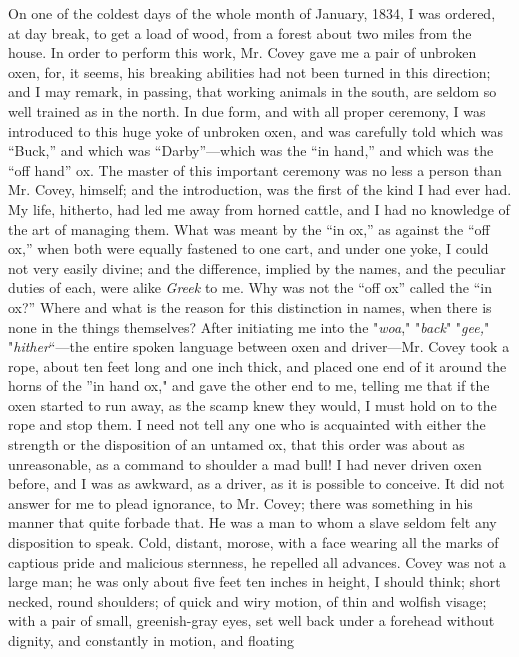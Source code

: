 On one of the coldest days of the whole month of January, 1834, I was
ordered, at day break, to get a load of wood, from a forest about two
miles from the {}house. In order to perform this work, Mr. Covey gave me
a pair of unbroken oxen, for, it seems, his breaking abilities had not
been turned in this direction; and I may remark, in passing, that
working animals in the south, are seldom so well trained as in the
north. In due form, and with all proper ceremony, I was introduced to
this huge yoke of unbroken oxen, and was carefully told which was
``Buck,'' and which was ``Darby''---which was the ``in hand,'' and which
was the ``off hand'' ox. The master of this important ceremony was no
less a person than Mr. Covey, himself; and the introduction, was the
first of the kind I had ever had. My life, hitherto, had led me away
from horned cattle, and I had no knowledge of the art of managing them.
What was meant by the ``in ox,'' as against the ``off ox,'' when both
were equally fastened to one cart, and under one yoke, I could not very
easily divine; and the difference, implied by the names, and the
peculiar duties of each, were alike \emph{Greek} to me. Why was not the
``off ox'' called the ``in ox?'' Where and what is the reason for this
distinction in names, when there is none in the things themselves? After
initiating me into the "\emph{woa}," "\emph{back}" "\emph{gee,}"
"\emph{hither}``---the entire spoken language between oxen and
driver---Mr. Covey took a rope, about ten feet long and one inch thick,
and placed one end of it around the horns of the ''in hand ox," and gave
the other end to me, telling me that if the oxen started to run away, as
the scamp knew they would, I must hold on to the rope and stop them. I
need not tell any one who is acquainted with either the strength or the
disposition of an untamed ox, that {}this order was about as
unreasonable, as a command to shoulder a mad bull! I had never driven
oxen before, and I was as awkward, as a driver, as it is possible to
conceive. It did not answer for me to plead ignorance, to Mr. Covey;
there was something in his manner that quite forbade that. He was a man
to whom a slave seldom felt any disposition to speak. Cold, distant,
morose, with a face wearing all the marks of captious pride and
malicious sternness, he repelled all advances. Covey was not a large
man; he was only about five feet ten inches in height, I should think;
short necked, round shoulders; of quick and wiry motion, of thin and
wolfish visage; with a pair of small, greenish-gray eyes, set well back
under a forehead without dignity, and constantly in motion, and floating
